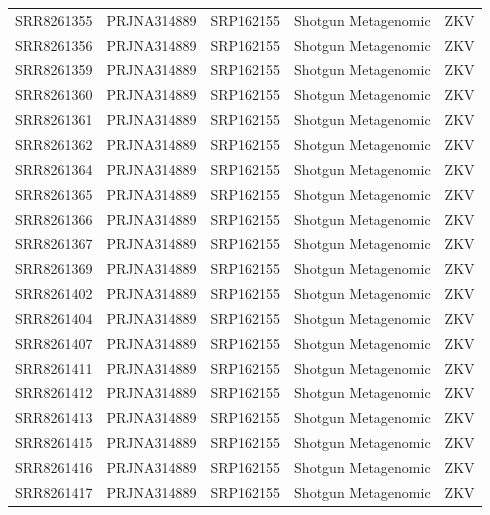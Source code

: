 \begin{longtable}{@{}lllll@{}}
SRR8261355 & PRJNA314889 & SRP162155 & Shotgun Metagenomic   & ZKV      \\
SRR8261356 & PRJNA314889 & SRP162155 & Shotgun Metagenomic   & ZKV      \\
SRR8261359 & PRJNA314889 & SRP162155 & Shotgun Metagenomic   & ZKV      \\
SRR8261360 & PRJNA314889 & SRP162155 & Shotgun Metagenomic   & ZKV      \\
SRR8261361 & PRJNA314889 & SRP162155 & Shotgun Metagenomic   & ZKV      \\
SRR8261362 & PRJNA314889 & SRP162155 & Shotgun Metagenomic   & ZKV      \\
SRR8261364 & PRJNA314889 & SRP162155 & Shotgun Metagenomic   & ZKV      \\
SRR8261365 & PRJNA314889 & SRP162155 & Shotgun Metagenomic   & ZKV      \\
SRR8261366 & PRJNA314889 & SRP162155 & Shotgun Metagenomic   & ZKV      \\
SRR8261367 & PRJNA314889 & SRP162155 & Shotgun Metagenomic   & ZKV      \\
SRR8261369 & PRJNA314889 & SRP162155 & Shotgun Metagenomic   & ZKV      \\
SRR8261402 & PRJNA314889 & SRP162155 & Shotgun Metagenomic   & ZKV      \\
SRR8261404 & PRJNA314889 & SRP162155 & Shotgun Metagenomic   & ZKV      \\
SRR8261407 & PRJNA314889 & SRP162155 & Shotgun Metagenomic   & ZKV      \\
SRR8261411 & PRJNA314889 & SRP162155 & Shotgun Metagenomic   & ZKV      \\
SRR8261412 & PRJNA314889 & SRP162155 & Shotgun Metagenomic   & ZKV      \\
SRR8261413 & PRJNA314889 & SRP162155 & Shotgun Metagenomic   & ZKV      \\
SRR8261415 & PRJNA314889 & SRP162155 & Shotgun Metagenomic   & ZKV      \\
SRR8261416 & PRJNA314889 & SRP162155 & Shotgun Metagenomic   & ZKV      \\
SRR8261417 & PRJNA314889 & SRP162155 & Shotgun Metagenomic   & ZKV  \bottomrule   
\end{longtable}

